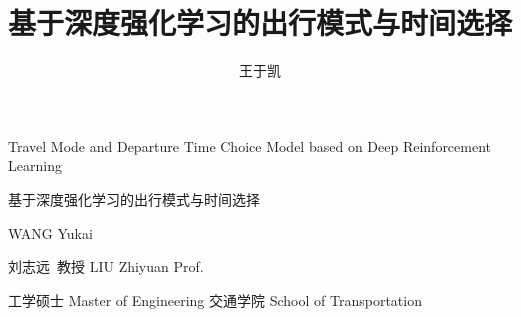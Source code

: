 \documentclass[algorithmlist,figurelist,tablelist,nomlist]{template/seumasterthesis}
\begin{document}

\title
    {基于深度强化学习的出行模式与时间选择}        %
    {}         %
    {Travel Mode and Departure Time Choice Model based on Deep Reinforcement Learning}  %
    {}            %

\spine
    {基于深度强化学习的出行模式与时间选择} 
    {}                                                               

\author
    {王于凯}                        %
    {WANG Yukai}                  %

\advisor
    {刘志远\ 教授}                %
    {LIU Zhiyuan}        %
    {Prof.}                     %
    
\degreetype                        %
    {工学硕士}
    {Master of Engineering}
\authorizedate{}                  %
\committeechair{}               %
\reviewer{}{}            %
\department                        %
    {交通学院}
    {School of Transportation}
\end{document}
